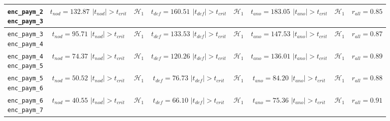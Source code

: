 \begin{table}[H]
{\begin{tabular}{|c|c|c|c|c|c|c|c|}
		\specialcell{\texttt{enc\_paym\_2}\\\texttt{enc\_paym\_3}} &
		\specialcell{$t_{nod} = 132.87$\\$|t_{nod}| > t_{crit}$} & $\mathcal{H}_1$ &
		\specialcell{$t_{def} = 160.51$\\$|t_{def}| > t_{crit}$} & $\mathcal{H}_1$ &
		\specialcell{$t_{ano} = 183.05$\\$|t_{ano}| > t_{crit}$} & $\mathcal{H}_1$ &
		$r_{all} = 0.85$ \\ \hline
		
		\specialcell{\texttt{enc\_paym\_3}\\\texttt{enc\_paym\_4}} &
		\specialcell{$t_{nod} = 95.71$\\$|t_{nod}| > t_{crit}$} & $\mathcal{H}_1$ &
		\specialcell{$t_{def} = 133.53$\\$|t_{def}| > t_{crit}$} & $\mathcal{H}_1$ &
		\specialcell{$t_{ano} = 147.53$\\$|t_{ano}| > t_{crit}$} & $\mathcal{H}_1$ &
		$r_{all} = 0.87$ \\ \hline
		
		\specialcell{\texttt{enc\_paym\_4}\\\texttt{enc\_paym\_5}} &
		\specialcell{$t_{nod} = 74.37$\\$|t_{nod}| > t_{crit}$} & $\mathcal{H}_1$ &
		\specialcell{$t_{def} = 120.26$\\$|t_{def}| > t_{crit}$} & $\mathcal{H}_1$ &
		\specialcell{$t_{ano} = 136.01$\\$|t_{ano}| > t_{crit}$} & $\mathcal{H}_1$ &
		$r_{all} = 0.89$ \\ \hline
		
		\specialcell{\texttt{enc\_paym\_5}\\\texttt{enc\_paym\_6}} &
		\specialcell{$t_{nod} = 50.52$\\$|t_{nod}| > t_{crit}$} & $\mathcal{H}_1$ &
		\specialcell{$t_{def} = 76.73$\\$|t_{def}| > t_{crit}$} & $\mathcal{H}_1$ &
		\specialcell{$t_{ano} = 84.20$\\$|t_{ano}| > t_{crit}$} & $\mathcal{H}_1$ &
		$r_{all} = 0.88$ \\ \hline
		
		\specialcell{\texttt{enc\_paym\_6}\\\texttt{enc\_paym\_7}} &
		\specialcell{$t_{nod} = 40.55$\\$|t_{nod}| > t_{crit}$} & $\mathcal{H}_1$ &
		\specialcell{$t_{def} = 66.10$\\$|t_{def}| > t_{crit}$} & $\mathcal{H}_1$ &
		\specialcell{$t_{ano} = 75.36$\\$|t_{ano}| > t_{crit}$} & $\mathcal{H}_1$ &
		$r_{all} = 0.91$ \\ \hline
		

\end{tabular}}
\end{table}
